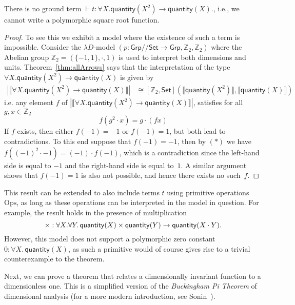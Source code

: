 \documentclass[a4paper,UKenglish]{lipics}
\theoremstyle{plain}
\newcommand{\msf}[1]{\mathsf{#1}} %
\newcommand{\Grp}{\msf{Grp}}
\newcommand{\Set}{\msf{Set}}
\newcommand{\GroupSet}[1]{[#1,\Set]}
\newcommand{\Lslice}[1]{#1/\!/\Set}
\newcommand{\GrpSet}{\Lslice{\Grp}}
\newcommand{\bbZ}{\mathbb{Z}}
\newcommand{\sem}[1]{\ensuremath{\llbracket #1 \rrbracket}}
\newcommand{\qnt}{\msf{quantity}}
\newcommand{\Dvar}{X}
\begin{document}
\begin{theorem}
\label{thm:UninhabType}
 There is no ground term  $\vdash t : \forall X . \qnt(X^2) \rightarrow \qnt(X)$., i.e., we cannot write a polymorphic square root function.
\end{theorem}
\begin{proof}
To see this we exhibit a model where the existence of such a term is impossible. Consider the $\lambda D$-model $(p:\GrpSet \rightarrow \Grp, \mathbb{Z}_2, \mathbb{Z}_2)$  where the Abelian group $\mathbb{Z}_2 = (\{ -1, 1\},\cdot,1)$ is used to interpret both dimensions and units. Theorem~\ref{thm:allArrows} says that the interpretation of the type $\forall X . \qnt(X^2) \rightarrow \qnt(X)$ is given by
\begin{align*}
  |\sem{\forall X . \qnt(X^2) \rightarrow \qnt(X)}|  &  \cong \GroupSet{\mathbb{Z}_2} (\sem{\qnt (X^2)}, \sem{\qnt(X)})
\end{align*}
i.e. any element $f$ of $ |\sem{\forall X . \qnt(X^2) \rightarrow \qnt(X)}|$, satisfies for all $g, x \in \bbZ_2$
\begin{equation}
f (g^2 \cdot x) = g \cdot (fx) \tag{$\ast$}
\end{equation}
If $f$ exists, then either $f(-1) = -1$ or $f(-1) = 1$, but both lead to contradictions. To this end suppose that $f(-1) = -1$, then by $(\ast)$
we have
$f((-1)^2 \cdot -1) = (-1) \cdot f(-1)$,
which is a contradiction since the left-hand side is equal to $-1$ and the right-hand side is equal to~$1$. A similar argument shows that $f(-1)=1$ is also not possible, and hence there exists no such~$f$.
\end{proof}

This result can be extended to also include terms $t$ using primitive
operations $\mathrm{Ops}$, as long as these operations can be interpreted
in the model in question.
For example, the result holds in the presence of multiplication
\[
\times:\forall X.\forall Y.\,\qnt(X)\times\qnt (Y)\to\qnt(X\cdot Y)\text.
\]
However, this model does not
support a polymorphic zero constant $0 : \forall \Dvar
.\, \qnt(\Dvar)$, as such a primitive would of course gives rise
to a trivial counterexample to the theorem.

Next, we can prove a theorem that relates a dimensionally invariant function to a dimensionless one. This is a simplified version of the \emph{Buckingham Pi Theorem} of dimensional analysis \cite{buckingham1914physically} (for a more modern introduction, see Sonin~\cite{sonin2001physical}).
\end{document}
